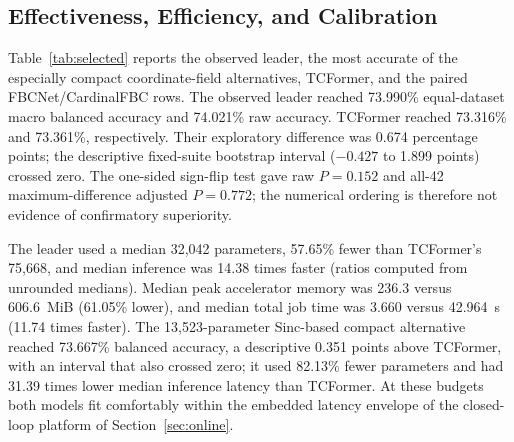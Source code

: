 \documentclass[journal,twoside,web]{template/ieeecolor2-tectonic}
\begin{document}
\subsection{Effectiveness, Efficiency, and Calibration}

Table~\ref{tab:selected} reports the observed leader, the most accurate of the especially compact coordinate-field alternatives, TCFormer, and the paired FBCNet/CardinalFBC rows. The observed leader reached 73.990\% equal-dataset macro balanced accuracy and 74.021\% raw accuracy. TCFormer reached 73.316\% and 73.361\%, respectively. Their exploratory difference was 0.674 percentage points; the descriptive fixed-suite bootstrap interval ($-0.427$ to 1.899 points) crossed zero. The one-sided sign-flip test gave raw $P=0.152$ and all-42 maximum-difference adjusted $P=0.772$; the numerical ordering is therefore not evidence of confirmatory superiority.

The leader used a median 32,042 parameters, 57.65\% fewer than TCFormer's 75,668, and median inference was 14.38 times faster (ratios computed from unrounded medians). Median peak accelerator memory was 236.3 versus 606.6~MiB (61.05\% lower), and median total job time was 3.660 versus 42.964~s (11.74 times faster). The 13,523-parameter Sinc-based compact alternative reached 73.667\% balanced accuracy, a descriptive 0.351 points above TCFormer, with an interval that also crossed zero; it used 82.13\% fewer parameters and had 31.39 times lower median inference latency than TCFormer. At these budgets both models fit comfortably within the embedded latency envelope of the closed-loop platform of Section~\ref{sec:online}.
\end{document}
